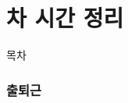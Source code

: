 \documentclass[aspectratio=1610,20pt,xcolor=pdftex,dvipsnames,table,handout]{beamer}
\begin{document}
		\part{차 시간 정리 }
		\frame{\partpage}

\label{part1} 	%


		\begin{frame} [plain]{목차}
		\tableofcontents%
		\end{frame}
		
		\begin{frame} [plain]
		\end{frame}

		\section{출퇴근}
\end{document}
